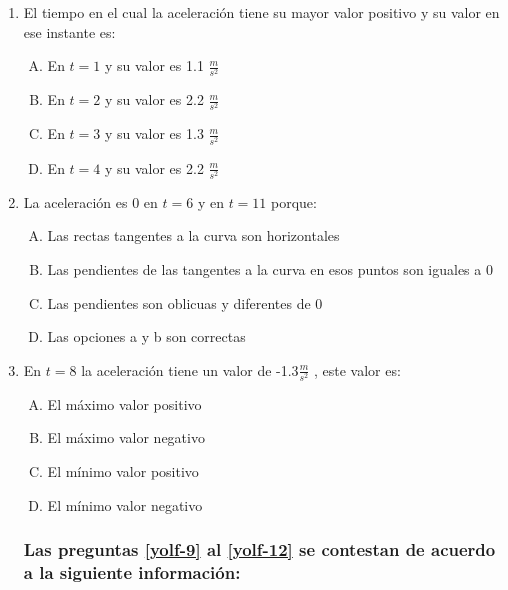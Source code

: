 \begin{enumerate}
\begin{enumerate}[(A)]
\end{enumerate}

\item El tiempo en el cual la aceleración tiene su mayor valor positivo y su valor en ese instante es: \label{yolf-6}\\

\begin{enumerate}[(A)]
\item  En $t=1$ y su valor es 1.1 $\frac{m}{s^2}$
\item  En $t=2$ y su valor es 2.2 $\frac{m}{s^2}$
\item  En $t=3$ y su valor es 1.3 $\frac{m}{s^2}$
\item  En $t=4$ y su valor es  2.2 $\frac{m}{s^2}$
\end{enumerate}

\item  La aceleración es 0 en $t=6$ y en $t=11$ porque: \label{yolf-7}\\

\begin{enumerate}[(A)]
\item  Las rectas tangentes a la curva son horizontales
\item  Las pendientes de las tangentes a la curva en esos puntos son iguales a 0
\item  Las pendientes son oblicuas y diferentes de 0
\item  Las opciones a y b son correctas
\end{enumerate}

\item  En $t=8$ la aceleración tiene un valor de -1.3$\frac{m}{s^2}$ , este valor es: \label{yolf-8}\\

\begin{enumerate}[(A)]
\item  El máximo valor positivo
\item  El máximo valor negativo
\item  El mínimo valor positivo
\item  El mínimo valor negativo
\end{enumerate}

\newpage
\subsubsection*{Las preguntas \ref{yolf-9} al \ref{yolf-12} se contestan de acuerdo a la siguiente información:}



\end{enumerate}

